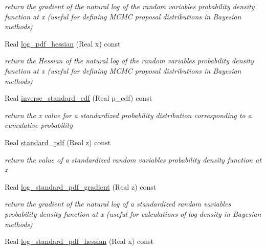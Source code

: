 \begin{DoxyCompactItemize}
\begin{DoxyCompactList}\small\item\em return the gradient of the natural log of the random variable\textquotesingle{}s probability density function at x (useful for defining M\+C\+MC proposal distributions in Bayesian methods) \end{DoxyCompactList}\item 
Real \hyperlink{classPecos_1_1UniformRandomVariable_a7b43f26f0f2bcdfef15d87e1f9399b33}{log\+\_\+pdf\+\_\+hessian} (Real x) const \label{classPecos_1_1UniformRandomVariable_a7b43f26f0f2bcdfef15d87e1f9399b33}

\begin{DoxyCompactList}\small\item\em return the Hessian of the natural log of the random variable\textquotesingle{}s probability density function at x (useful for defining M\+C\+MC proposal distributions in Bayesian methods) \end{DoxyCompactList}\item 
Real \hyperlink{classPecos_1_1UniformRandomVariable_acffcd338a207168a147fffe0778ccf3c}{inverse\+\_\+standard\+\_\+cdf} (Real p\+\_\+cdf) const \label{classPecos_1_1UniformRandomVariable_acffcd338a207168a147fffe0778ccf3c}

\begin{DoxyCompactList}\small\item\em return the x value for a standardized probability distribution corresponding to a cumulative probability \end{DoxyCompactList}\item 
Real \hyperlink{classPecos_1_1UniformRandomVariable_a206a02581b82f44be4a5321488a12daa}{standard\+\_\+pdf} (Real z) const \label{classPecos_1_1UniformRandomVariable_a206a02581b82f44be4a5321488a12daa}

\begin{DoxyCompactList}\small\item\em return the value of a standardized random variable\textquotesingle{}s probability density function at x \end{DoxyCompactList}\item 
Real \hyperlink{classPecos_1_1UniformRandomVariable_a73ea75d51f5415f600bebbca4a9628b7}{log\+\_\+standard\+\_\+pdf\+\_\+gradient} (Real z) const \label{classPecos_1_1UniformRandomVariable_a73ea75d51f5415f600bebbca4a9628b7}

\begin{DoxyCompactList}\small\item\em return the gradient of the natural log of a standardized random variable\textquotesingle{}s probability density function at x (useful for calculations of log density in Bayesian methods) \end{DoxyCompactList}\item 
Real \hyperlink{classPecos_1_1UniformRandomVariable_a86c01ce423ca87146b65a6ac1efd9398}{log\+\_\+standard\+\_\+pdf\+\_\+hessian} (Real x) const \label{classPecos_1_1UniformRandomVariable_a86c01ce423ca87146b65a6ac1efd9398}


\end{DoxyCompactItemize}
